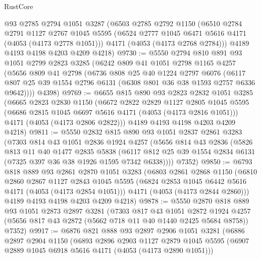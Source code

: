 \begin{lexlean}{RustCore}
\begin{coremodule}
    @93
    @2785
    @2794
    @1051
    @3287
    (@6503
      @2785
      @2792
      @1150
      (@6510
        @2784
        @2791
        @1127
        @2767
        @1045
        @5595
        (@6524 @2777 @1045 @6471 @5616 @4171 (@4053 (@4173 @2778 @1051)))
        @4171
        (@4053 (@4173 @2768 @2784)))
      @4189
      @4193
      @4198
      @4203
      @4209
      @4218)
@9730 := @5550
    @2794
    @810
    @891
    @93
    @1051
    @2799
    @2823
    @3285
    (@6242
      @809
      @41
      @1051
      @2798
      @1165
      @4257
      (@5656
        @809
        @41
        @2798
        (@6736
          @808
          @25
          @40
          @1224
          @2797
          @6076
          (@6117 @807 @25 @39 @1554 @2796 @6131 (@6308 @801 @36 @38 @1593 @2757 @6336 @9642))))
      @4398)
@9769 := @6655
    @815
    @890
    @93
    @2823
    @2832
    @1051
    @3285
    (@6665
      @2823
      @2830
      @1150
      (@6672
        @2822
        @2829
        @1127
        @2805
        @1045
        @5595
        (@6686 @2815 @1045 @6697 @5616 @4171 (@4053 (@4173 @2816 @1051)))
        @4171
        (@4053 (@4173 @2806 @2822)))
      @4189
      @4193
      @4198
      @4203
      @4209
      @4218)
@9811 := @5550
    @2832
    @815
    @890
    @93
    @1051
    @2837
    @2861
    @3283
    (@7303
      @814
      @43
      @1051
      @2836
      @1924
      @4257
      (@5656
        @814
        @43
        @2836
        (@5826
          @813
          @11
          @40
          @1477
          @2835
          @5838
          (@6117 @812 @25 @39 @1554 @2834 @6131 (@7325 @397 @36 @38 @1926 @1595 @7342 @6338))))
      @7352)
@9850 := @6793
    @818
    @889
    @93
    @2861
    @2870
    @1051
    @3283
    (@6803
      @2861
      @2868
      @1150
      (@6810
        @2860
        @2867
        @1127
        @2843
        @1045
        @5595
        (@6824 @2853 @1045 @6442 @5616 @4171 (@4053 (@4173 @2854 @1051)))
        @4171
        (@4053 (@4173 @2844 @2860)))
      @4189
      @4193
      @4198
      @4203
      @4209
      @4218)
@9878 := @5550
    @2870
    @818
    @889
    @93
    @1051
    @2873
    @2897
    @3281
    (@7303
      @817
      @43
      @1051
      @2872
      @1924
      @4257
      (@5656 @817 @43 @2872 (@5662 @718 @11 @40 @1440 @2425 @5684 @8758))
      @7352)
@9917 := @6876
    @821
    @888
    @93
    @2897
    @2906
    @1051
    @3281
    (@6886
      @2897
      @2904
      @1150
      (@6893
        @2896
        @2903
        @1127
        @2879
        @1045
        @5595
        (@6907 @2889 @1045 @6918 @5616 @4171 (@4053 (@4173 @2890 @1051)))

\end{coremodule}
\end{lexlean}
